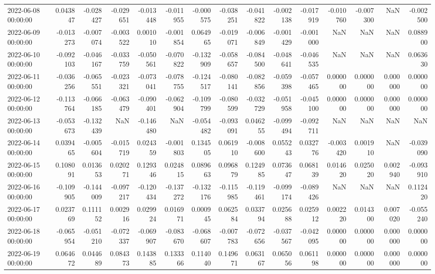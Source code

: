 \begin{tabular}{lrrrrrrrrrrrrrr}
2022-06-08 00:00:00 & 0.043847 & -0.028427 & -0.029651 & -0.013448 & -0.011955 & -0.000575 & -0.038251 & -0.041822 & -0.002138 & -0.017919 & -0.010760 & -0.007300 & NaN & -0.002500 \\
2022-06-09 00:00:00 & -0.013273 & -0.007074 & -0.003522 & 0.001010 & -0.001854 & 0.064965 & -0.019071 & -0.006849 & -0.001429 & -0.001000 & NaN & NaN & NaN & 0.088900 \\
2022-06-10 00:00:00 & -0.092103 & -0.046167 & -0.033759 & -0.050561 & -0.070822 & -0.132909 & -0.058657 & -0.084500 & -0.048641 & -0.046535 & NaN & NaN & NaN & 0.063630 \\
2022-06-11 00:00:00 & -0.036256 & -0.065551 & -0.023321 & -0.073041 & -0.078755 & -0.124517 & -0.080141 & -0.082856 & -0.059398 & -0.057465 & 0.000000 & 0.000000 & 0.000000 & 0.000000 \\
2022-06-12 00:00:00 & -0.113764 & -0.066185 & -0.063479 & -0.090401 & -0.062904 & -0.109799 & -0.080599 & -0.032729 & -0.051958 & -0.045100 & 0.000000 & 0.000000 & 0.000000 & 0.000000 \\
2022-06-13 00:00:00 & -0.053673 & -0.132439 & NaN & -0.146480 & NaN & -0.054482 & -0.093091 & 0.046255 & -0.099494 & -0.092711 & NaN & NaN & NaN & NaN \\
2022-06-14 00:00:00 & 0.039465 & -0.005604 & -0.015719 & 0.024359 & -0.001803 & 0.134505 & 0.061910 & -0.008600 & 0.055243 & 0.032776 & -0.003420 & 0.001910 & NaN & -0.039090 \\
2022-06-15 00:00:00 & 0.108091 & 0.013653 & 0.020271 & 0.129346 & 0.024815 & 0.089663 & 0.096879 & 0.124985 & 0.073647 & 0.068139 & 0.014620 & 0.025020 & 0.002940 & -0.093910 \\
2022-06-16 00:00:00 & -0.109905 & -0.144009 & -0.097217 & -0.120434 & -0.137272 & -0.132176 & -0.115985 & -0.119461 & -0.099174 & -0.089426 & NaN & NaN & NaN & 0.112420 \\
2022-06-17 00:00:00 & 0.023769 & 0.111152 & 0.002916 & 0.029924 & 0.016971 & 0.000945 & 0.062584 & 0.033794 & 0.025688 & 0.025912 & 0.002220 & 0.014300 & 0.007020 & -0.055240 \\
2022-06-18 00:00:00 & -0.065954 & -0.051210 & -0.072337 & -0.069907 & -0.083670 & -0.068607 & -0.007783 & -0.072656 & -0.037567 & -0.042095 & 0.000000 & 0.000000 & 0.000000 & 0.000000 \\
2022-06-19 00:00:00 & 0.064672 & 0.044689 & 0.084373 & 0.143885 & 0.133366 & 0.114040 & 0.149671 & 0.063167 & 0.065056 & 0.061198 & 0.000000 & 0.000000 & 0.000000 & 0.000000 \\

\end{tabular}
